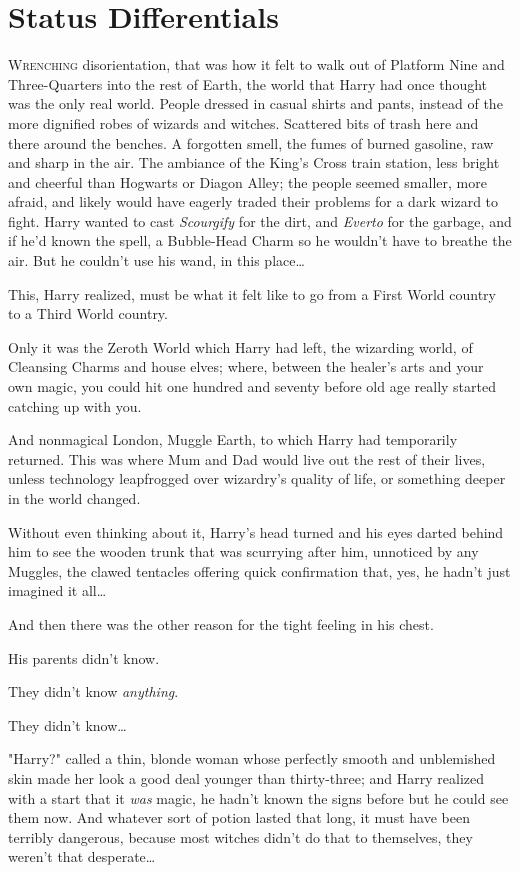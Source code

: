\chapter{Status Differentials}

\lettrine{W}{renching}
disorientation, that was how it felt to walk out of Platform Nine and 
Three-Quarters into the rest of Earth, the world that Harry had once thought 
was the only real world. People dressed in casual shirts and pants, instead of 
the more dignified robes of wizards and witches. Scattered bits of trash here 
and there around the benches. A forgotten smell, the fumes of burned gasoline, 
raw and sharp in the air. The ambiance of the King's Cross train station, less 
bright and cheerful than Hogwarts or Diagon Alley; the people seemed smaller, 
more afraid, and likely would have eagerly traded their problems for a dark 
wizard to fight. Harry wanted to cast \emph{Scourgify} for the dirt, and 
\emph{Everto} for the garbage, and if he'd known the spell, a Bubble-Head Charm 
so he wouldn't have to breathe the air. But he couldn't use his wand, in this 
place{\ldots}

This, Harry realized, must be what it felt like to go from a First World 
country to a Third World country.

Only it was the Zeroth World which Harry had left, the wizarding world, of 
Cleansing Charms and house elves; where, between the healer's arts and your own 
magic, you could hit one hundred and seventy before old age really started 
catching up with you.

And nonmagical London, Muggle Earth, to which Harry had temporarily returned. 
This was where Mum and Dad would live out the rest of their lives, unless 
technology leapfrogged over wizardry's quality of life, or something deeper in 
the world changed.

Without even thinking about it, Harry's head turned and his eyes darted behind 
him to see the wooden trunk that was scurrying after him, unnoticed by any 
Muggles, the clawed tentacles offering quick confirmation that, yes, he hadn't 
just imagined it all{\ldots}

And then there was the other reason for the tight feeling in his chest.

His parents didn't know.

They didn't know \emph{anything}.

They didn't know{\ldots}

"Harry?" called a thin, blonde woman whose perfectly smooth and unblemished 
skin made her look a good deal younger than thirty-three; and Harry realized 
with a start that it \emph{was} magic, he hadn't known the signs before but he 
could see them now. And whatever sort of potion lasted that long, it must have 
been terribly dangerous, because most witches didn't do that to themselves, 
they weren't that desperate{\ldots}

